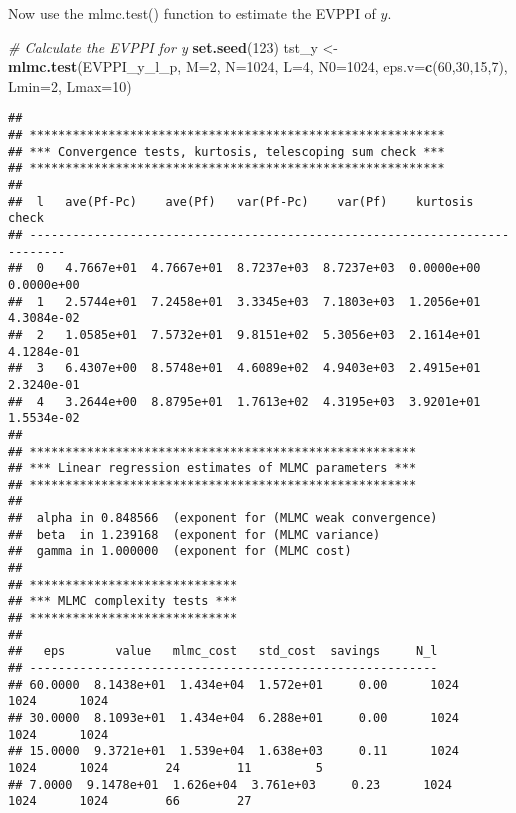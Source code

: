 \documentclass[
]{article}
\newenvironment{Shaded}{\begin{snugshade}}{\end{snugshade}}
\newcommand{\CommentTok}[1]{\textcolor[rgb]{0.56,0.35,0.01}{\textit{#1}}}
\newcommand{\DataTypeTok}[1]{\textcolor[rgb]{0.13,0.29,0.53}{#1}}
\newcommand{\DecValTok}[1]{\textcolor[rgb]{0.00,0.00,0.81}{#1}}
\newcommand{\KeywordTok}[1]{\textcolor[rgb]{0.13,0.29,0.53}{\textbf{#1}}}
\newcommand{\NormalTok}[1]{#1}
\newcommand{\StringTok}[1]{\textcolor[rgb]{0.31,0.60,0.02}{#1}}
\begin{document}
Now use the mlmc.test() function to estimate the EVPPI of \(y\).

\begin{Shaded}
\begin{Highlighting}[]
\CommentTok{# Calculate the EVPPI for y}
\KeywordTok{set.seed}\NormalTok{(}\DecValTok{123}\NormalTok{)}
\NormalTok{tst_y <-}\StringTok{ }\KeywordTok{mlmc.test}\NormalTok{(EVPPI_y_l_p, }\DataTypeTok{M=}\DecValTok{2}\NormalTok{, }\DataTypeTok{N=}\DecValTok{1024}\NormalTok{,}
                   \DataTypeTok{L=}\DecValTok{4}\NormalTok{, }\DataTypeTok{N0=}\DecValTok{1024}\NormalTok{,}
                   \DataTypeTok{eps.v=}\KeywordTok{c}\NormalTok{(}\DecValTok{60}\NormalTok{,}\DecValTok{30}\NormalTok{,}\DecValTok{15}\NormalTok{,}\DecValTok{7}\NormalTok{),}
                  \DataTypeTok{Lmin=}\DecValTok{2}\NormalTok{, }\DataTypeTok{Lmax=}\DecValTok{10}\NormalTok{)}
\end{Highlighting}
\end{Shaded}

\begin{verbatim}
## 
## **********************************************************
## *** Convergence tests, kurtosis, telescoping sum check ***
## **********************************************************
## 
##  l   ave(Pf-Pc)    ave(Pf)   var(Pf-Pc)    var(Pf)    kurtosis     check 
## ---------------------------------------------------------------------------
##  0   4.7667e+01  4.7667e+01  8.7237e+03  8.7237e+03  0.0000e+00  0.0000e+00 
##  1   2.5744e+01  7.2458e+01  3.3345e+03  7.1803e+03  1.2056e+01  4.3084e-02 
##  2   1.0585e+01  7.5732e+01  9.8151e+02  5.3056e+03  2.1614e+01  4.1284e-01 
##  3   6.4307e+00  8.5748e+01  4.6089e+02  4.9403e+03  2.4915e+01  2.3240e-01 
##  4   3.2644e+00  8.8795e+01  1.7613e+02  4.3195e+03  3.9201e+01  1.5534e-02 
## 
## ******************************************************
## *** Linear regression estimates of MLMC parameters ***
## ******************************************************
## 
##  alpha in 0.848566  (exponent for (MLMC weak convergence)
##  beta  in 1.239168  (exponent for (MLMC variance) 
##  gamma in 1.000000  (exponent for (MLMC cost) 
## 
## ***************************** 
## *** MLMC complexity tests *** 
## ***************************** 
## 
##   eps       value   mlmc_cost   std_cost  savings     N_l 
## --------------------------------------------------------- 
## 60.0000  8.1438e+01  1.434e+04  1.572e+01     0.00      1024      1024      1024
## 30.0000  8.1093e+01  1.434e+04  6.288e+01     0.00      1024      1024      1024
## 15.0000  9.3721e+01  1.539e+04  1.638e+03     0.11      1024      1024      1024        24        11         5
## 7.0000  9.1478e+01  1.626e+04  3.761e+03     0.23      1024      1024      1024        66        27
\end{verbatim}
\end{document}
